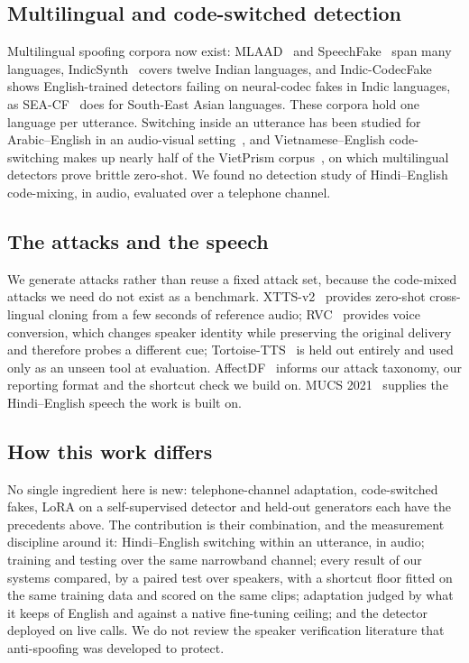 \subsection{Multilingual and code-switched detection}

Multilingual spoofing corpora now exist: MLAAD~\cite{muller2024mlaad} and
SpeechFake~\cite{huang2025speechfake} span many languages, IndicSynth~\cite{sharma2025indicsynth}
covers twelve Indian languages, and Indic-CodecFake~\cite{girish2026indiccodecfake}
shows English-trained detectors failing on neural-codec fakes in Indic languages, as
SEA-CF~\cite{phukan2026seacf} does for South-East Asian languages. These corpora hold one
language per utterance. Switching inside an utterance has been studied for Arabic--English
in an audio-visual setting~\cite{kuckreja2026habibi}, and Vietnamese--English
code-switching makes up nearly half of the VietPrism corpus~\cite{hoang2026vietprism}, on
which multilingual detectors prove brittle zero-shot. We found no detection study of
Hindi--English code-mixing, in audio, evaluated over a telephone channel.

\subsection{The attacks and the speech}

We generate attacks rather than reuse a fixed attack set, because the code-mixed
attacks we need do not exist as a benchmark. XTTS-v2~\cite{casanova2024xtts} provides
zero-shot cross-lingual cloning from a few seconds of reference audio;
RVC~\cite{rvc2023} provides voice conversion, which changes speaker identity while
preserving the original delivery and therefore probes a different cue;
Tortoise-TTS~\cite{betker2023tortoise} is held out entirely and used only as an
unseen tool at evaluation. AffectDF~\cite{affectdf2026} informs our attack taxonomy,
our reporting format and the shortcut check we build on. MUCS
2021~\cite{diwan2021mucs} supplies the Hindi--English speech the work is built on.

\subsection{How this work differs}

No single ingredient here is new: telephone-channel adaptation, code-switched
fakes, LoRA on a self-supervised detector and held-out generators each have the
precedents above. The contribution is their combination, and the measurement
discipline around it: Hindi--English switching within an utterance, in audio;
training and testing over the same narrowband channel; every result of our systems
compared, by a paired test over speakers, with a shortcut floor fitted on the same training data
and scored on the same clips; adaptation judged by what it keeps of English and
against a native fine-tuning ceiling; and the detector deployed on live calls. We do
not review the speaker verification literature that anti-spoofing was developed to
protect.
